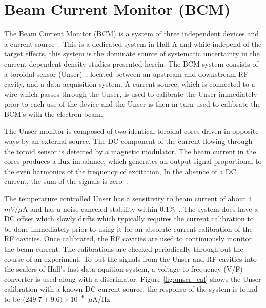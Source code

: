 \documentclass[final,5p,times,twocolumn]{elsarticle}
\begin{document}
\section{Beam Current Monitor (BCM)}
\label{BCM}

The Beam Current Monitor (BCM) is a system of three independent devices and a current source~\cite{Denard:2001zg}. 
This is a dedicated system in Hall A and while independ of the target effects, this system
is the dominate source of systematic uncertainty in the current dependent density studies presented
herein.  The BCM system consists of a toroidal sensor (Unser)~\cite{Unser:1991dr}, located between 
an upstream and downstream RF cavity, and a data-acquisition system.  A current source, which is connected to a wire which 
passes through the Unser, is used to calibrate the Unser immediately prior to each use of the device and
the Unser is then in turn used to calibrate the BCM's with the electron beam. 

The Unser monitor is composed of two identical toroidal cores driven in opposite ways by an external source.  
The DC component of the current flowing through the toroid sensor is detected by a magnetic modulator. The 
beam current in the cores produces a flux imbalance, which generates an output signal proportional to the 
even harmonics of the frequency of excitation, In the absence of a DC current, the sum of the signals is zero~\cite{Denard:2001zg}. 

The temperature controlled Unser has a sensitivity to beam current of about 4~$mV/\mu$A and has a noise canceled 
stability within $0.1\%$~\cite{Denard:2001zg}.  The system does have a DC offset which slowly drifts which typically 
requires the current calibration to be done immediately prior to using it for an absolute current calibration
of the RF cavities.  Once calibrated, the RF cavities are used to continuously monitor the beam current. 
The calibrations are checked periodically through out the course of an experiment. 
To put the signals from the Unser and RF cavities into the scalers of Hall's fast data aquition system,
a voltage to frequency (V/F) converter is used along with a discrimator. 
Figure \ref{fig:unser_cal} shows the Unser calibration with a known DC current source, 
the response of the system is found to be ($249.7 \pm 9.6) \times 10^{-6}$~$\mu$A/Hz. 
\end{document}
